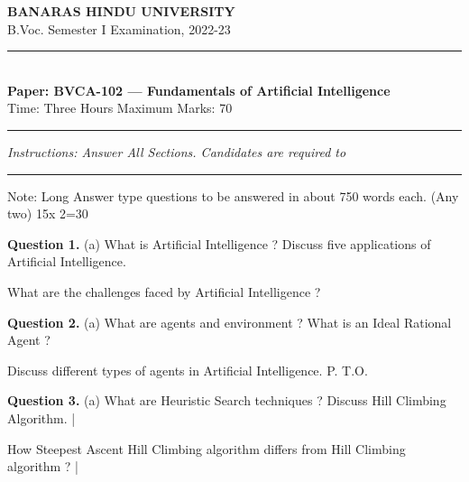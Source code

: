 \documentclass[11pt,a4paper]{article}
\begin{document}
\begin{center}
  {\large\bfseries BANARAS HINDU UNIVERSITY}\\[2pt]
  {\normalsize B.Voc. Semester I Examination, 2022-23}\\[6pt]
  \rule{0.8\linewidth}{0.5pt}\\[6pt]
  {\large\bfseries Paper: BVCA-102 --- Fundamentals of Artificial Intelligence}\\[4pt]
  {\normalsize Time: Three Hours \hfill Maximum Marks: 70}
\end{center}

\rule{\linewidth}{0.4pt}

\smallskip
\noindent\textit{Instructions: Answer All Sections. Candidates are required to}

\bigskip

\smallskip

\bigskip{}
\rule{\linewidth}{0.4pt}\smallskip

Note: Long Answer type questions to be answered in
about 750 words each. (Any two) 15x 2=30

\medskip\noindent\textbf{Question 1.} (a) What is Artificial Intelligence ? Discuss five
applications of Artificial Intelligence.
\begin{parts}
  \item What are the challenges faced by Artificial
  Intelligence ?
\end{parts}

\medskip\noindent\textbf{Question 2.} (a) What are agents and environment ? What is an
Ideal Rational Agent ?
\begin{parts}
  \item Discuss different types of agents in Artificial
  Intelligence.
  P. T.O.
\end{parts}

\medskip\noindent\textbf{Question 3.} (a) What are Heuristic Search techniques ? Discuss
Hill Climbing Algorithm. |
\begin{parts}
  \item How Steepest Ascent Hill Climbing algorithm
  differs from Hill Climbing algorithm ? |
\end{parts}
\end{document}

